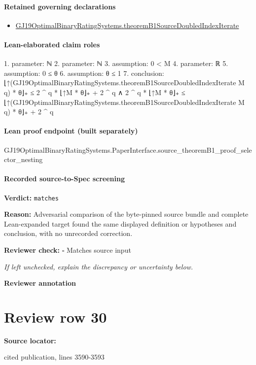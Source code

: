\documentclass[10pt]{article}
\newcommand{\reviewerbox}{%
  \par\noindent\fbox{\parbox{0.96\linewidth}{\rule{0pt}{0.38in}}}\par
}
\newcommand{\reviewmatch}[1]{%
  \par\noindent\textbf{Reviewer check:} $\square$\; #1\par
  \noindent\emph{If left unchecked, explain the discrepancy or uncertainty below.}\par
}
\begin{document}
\paragraph{Retained governing declarations}
\begin{itemize}\raggedright
\item \hyperlink{governing-declaration-a0ec7afc30bfc0c5}{GJ19\allowbreak{}Optimal\allowbreak{}Binary\allowbreak{}Rating\allowbreak{}Systems.\allowbreak{}theorem\allowbreak{}B1\allowbreak{}Source\allowbreak{}Doubled\allowbreak{}Index\allowbreak{}Iterate}
\end{itemize}
\paragraph{Lean-elaborated claim roles}\begin{ReviewVerbatim}
1. parameter: ℕ
2. parameter: ℕ
3. assumption: 0 < M
4. parameter: ℝ
5. assumption: 0 ≤ θ
6. assumption: θ ≤ 1
7. conclusion: ⌊↑(GJ19OptimalBinaryRatingSystems.theoremB1SourceDoubledIndexIterate M q) * θ⌋₊ ≤ 2 ^ q * ⌊↑M * θ⌋₊ + 2 ^ q ∧
  2 ^ q * ⌊↑M * θ⌋₊ ≤ ⌊↑(GJ19OptimalBinaryRatingSystems.theoremB1SourceDoubledIndexIterate M q) * θ⌋₊ + 2 ^ q
\end{ReviewVerbatim}

\paragraph{Lean proof endpoint (built separately)}\begin{ReviewVerbatim}
GJ19OptimalBinaryRatingSystems.PaperInterface.source_theoremB1_proof_selector_nesting
\end{ReviewVerbatim}

\paragraph{Recorded source-to-Spec screening}
\textbf{Verdict:} \texttt{matches}
\\
{\raggedright
\textbf{Reason:} Adversarial comparison of the byte-\allowbreak{}pinned source bundle and complete Lean-\allowbreak{}expanded target found the same displayed definition or hypotheses and conclusion, with no unrecorded correction.\allowbreak{}
\par}
\reviewmatch{Matches source input}
\noindent\textbf{Reviewer annotation}\par
\reviewerbox
\clearpage
\hypertarget{source-claim-b7febbacfb3801fa}{}
\section*{Review row 30}
\textbf{Source locator:} {\footnotesize\raggedright cited publication, lines 3590-\allowbreak{}3593\par}
\end{document}
